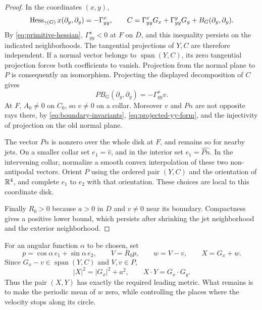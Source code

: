 \begin{proof}
In the coordinates $(x,y)$,
\[
 \operatorname{Hess}_{\gamma(G)}x(\partial_y,\partial_y)=-\Gamma^x_{yy},\qquad
 C=\Gamma^x_{yy}G_x+\Gamma^y_{yy}G_y+B_G(\partial_y,\partial_y).
\]
By \eqref{eq:primitive-hessian}, $\Gamma^x_{yy}<0$ at $F$ on
$\overline D$, and this inequality persists on the indicated
neighborhoods.  The tangential projections of $Y,C$ are therefore
independent.  If a normal vector belongs to $\operatorname{span}(Y,C)$,
its zero tangential projection forces both coefficients to vanish.
Projection from the normal plane to $P$ is consequently an isomorphism.
Projecting the displayed decomposition of $C$ gives
\begin{equation}
 P B_G(\partial_y,\partial_y)=-\Gamma^x_{yy}v.
 \label{eq:projected-yy-form}
\end{equation}
At $F$, $A_0\ne0$ on $C_0$, so $v\ne0$ on a collar.  Moreover $v$ and
$Pn$ are not opposite rays there, by
\eqref{eq:boundary-invariants}, \eqref{eq:projected-yy-form}, and the
injectivity of projection on the old normal plane.

The vector $Pn$ is nonzero over the whole disk at $F$, and remains so for
nearby jets.  On a smaller collar set $e_1=\widehat v$, and in the
interior set $e_1=\widehat{Pn}$.  In the intervening collar, normalize a
smooth convex interpolation of these two non-antipodal vectors.
Orient $P$ using the ordered pair $(Y,C)$ and the orientation of $\mathbb{R}^4$,
and complete $e_1$ to $e_2$ with that orientation.  These choices are
local to this coordinate disk.

Finally $R_0>0$ because $a>0$ in $D$ and $v\ne0$ near its boundary.
Compactness gives a positive lower bound, which persists after shrinking
the jet neighborhood and the exterior neighborhood.
\end{proof}

For an angular function $\alpha$ to be chosen, set
\begin{equation}
 p=\cos\alpha\,e_1+\sin\alpha\,e_2,\qquad
 V=R_0p,\qquad w=V-v,\qquad X=G_x+w.
 \label{eq:leading-velocity}
\end{equation}
Since $G_x-v\in\operatorname{span}(Y,C)$ and $V,v\in P$,
\begin{equation}
 |X|^2=|G_x|^2+a^2,\qquad X\cdot Y=G_x\cdot G_y.
 \label{eq:leading-metric}
\end{equation}
Thus the pair $(X,Y)$ has exactly the required leading metric.  What
remains is to make the periodic mean of $w$ zero, while controlling the
places where the velocity stops along its circle.

